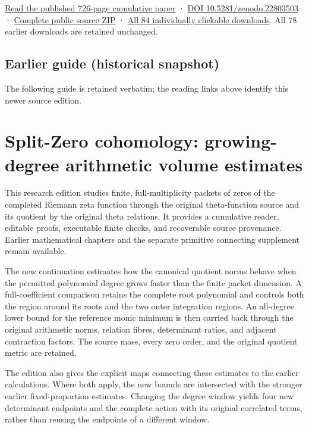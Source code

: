 \documentclass[
]{article}
\begin{document}
\href{https://zenodo.org/api/records/22803503/files/82-splitzero-moving-cutoff-reader.pdf/content}{Read
the published 726-page cumulative paper} ·
\href{https://doi.org/10.5281/zenodo.22803503}{DOI
10.5281/zenodo.22803503} ·
\href{https://zenodo.org/api/records/22803503/files/83-splitzero-moving-cutoff-sources.zip/content}{Complete
public source ZIP} ·
\href{https://github.com/KokunoYumeto/zeta-function-research-reader/blob/main/calculation_edition_20260917_moving_cutoff_growing_ratio/README.md}{All
84 individually clickable downloads}. All 78 earlier downloads are
retained unchanged.

\subsection{Earlier guide (historical
snapshot)}\label{earlier-guide-historical-snapshot-7}

The following guide is retained verbatim; the reading links above
identify this newer source edition.

\section{Split-Zero cohomology: growing-degree arithmetic volume
estimates}\label{split-zero-cohomology-growing-degree-arithmetic-volume-estimates}

This research edition studies finite, full-multiplicity packets of zeros
of the completed Riemann zeta function through the original
theta-function source and its quotient by the original theta relations.
It provides a cumulative reader, editable proofs, executable finite
checks, and recoverable source provenance. Earlier mathematical chapters
and the separate primitive connecting supplement remain available.

The new continuation estimates how the canonical quotient norms behave
when the permitted polynomial degree grows faster than the finite packet
dimension. A full-coefficient comparison retains the complete root
polynomial and controls both the region around its roots and the two
outer integration regions. An all-degree lower bound for the reference
monic minimum is then carried back through the original arithmetic
norms, relation fibres, determinant ratios, and adjacent contraction
factors. The source mass, every zero order, and the original quotient
metric are retained.

The edition also gives the explicit maps connecting these estimates to
the earlier calculations. Where both apply, the new bounds are
intersected with the stronger earlier fixed-proportion estimates.
Changing the degree window yields four new determinant endpoints and the
complete action with its original correlated terms, rather than reusing
the endpoints of a different window.
\end{document}
